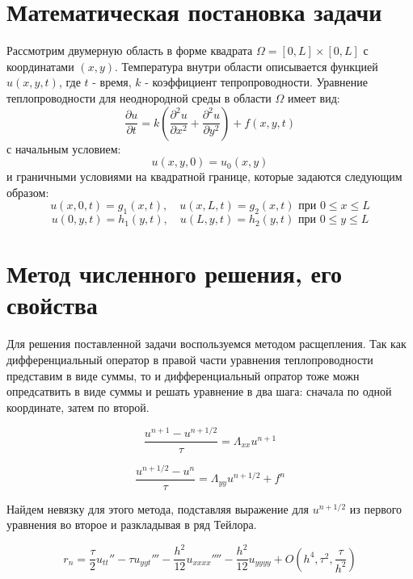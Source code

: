 \documentclass[a4paper]{article}
\begin{document}
\section{Математическая постановка задачи}
Рассмотрим двумерную область в форме квадрата $\Omega = [0, L] \times [0, L]$ с координатами $(x, y)$. Температура внутри области описывается функцией $u(x, y, t)$, где $t$ - время, $k$ - коэффициент тепропроводности.
Уравнение теплопроводности для неоднородной среды в области $\Omega$ имеет вид:
\begin{equation}
\frac{\partial u}{\partial t} = k \left( \frac{\partial^2 u}{\partial x^2} + \frac{\partial^2 u}{\partial y^2} \right) + f(x, y, t)
\end{equation}
с начальным условием:
\begin{equation}
u(x, y, 0) = u_0(x, y)
\end{equation}
и граничными условиями на квадратной границе, которые задаются следующим образом:
\begin{equation}
u(x, 0, t) = g_1(x, t), \quad u(x, L, t) = g_2(x, t) \text{ при } 0 \leq x \leq L
\end{equation}
\begin{equation}
u(0, y, t) = h_1(y, t), \quad u(L, y, t) = h_2(y, t) \text{ при } 0 \leq y \leq L
\end{equation}

\section{Метод численного решения, его свойства}
Для решения поставленной задачи воспользуемся методом расщепления. Так как дифференциальный оператор в правой части уравнения теплопроводности представим в виде суммы, то и дифференциальный опратор тоже можн опредсатвить в виде суммы и решать уравнение в два шага: сначала по одной координате, затем по второй. 

\begin{equation}
	\frac{u^{n + 1} - u^{n + 1/2}}{\tau} = \Lambda_{xx}{u^{n + 1}}
\end{equation}

\begin{equation}
	\frac{u^{n + 1/2} - u^{n}}{\tau} = \Lambda_{yy}{u^{n + 1/2}} + f^{n}
\end{equation}

Найдем невязку для этого метода, подставляя выражение для $u^{n + 1/2}$ из первого уравнения во второе и разкладывая в ряд Тейлора.

\begin{equation}
	r_n = \frac{\tau}{2} u_{tt}'' - \tau u_{yyt}'''- \frac{h^2}{12} u_{xxxx}'''' - \frac{h^2}{12} u_{yyyy} + O(h^4, \tau^2, \frac{\tau}{h^2})
\end{equation}
\end{document}

